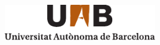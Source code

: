 \documentclass[paper=a4, fontsize=12pt, twoside=semi, abstracton, listof=totoc, toc=left]{scrartcl}
\title{
	\normalfont
    \includegraphics[width=0.5\textwidth]{images/uab-logo} \\
	\horrule{0.5pt} \\ [0.4cm]
	\huge \scshape{\mytitle} \\
	\Large \scshape{\mysubtitle} \\
	\horrule{2pt} \\ [0.5cm]
}
\author{\myauthor }
\date{\mydate}
\newenvironment{mydedication}
	{\clearpage           %
	\thispagestyle{empty}%
	\vspace*{\stretch{1}}%
	\itshape             %
	\raggedleft          %
	}
	{\par %
	\vspace{\stretch{3}} %
	\clearpage           %
	}
\begin{document}
\clearpage\maketitle
\thispagestyle{empty}
\addtocounter{page}{-1}


% 

\tableofcontents




% 



\nocite{Pearl1984}
\nocite{Sean2010}
\nocite{Erickson2014}

\printbibliography[heading=bibintoc]

% 
% 
\end{document}
